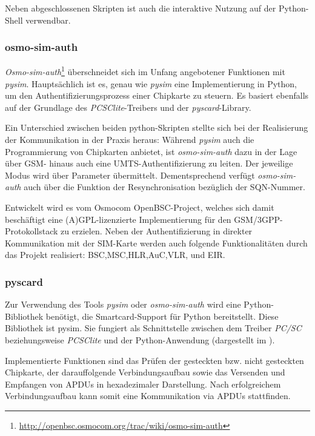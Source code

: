 Neben abgeschlossenen Skripten ist auch die interaktive Nutzung auf der
Python-Shell verwendbar.

\subsubsection{osmo-sim-auth}
\label{subsec:osmosim}
\textit{Osmo-sim-auth}\footnote{\url{http://openbsc.osmocom.org/trac/wiki/osmo-sim-auth}}
überschneidet sich im Unfang angebotener Funktionen mit \textit{pysim}. Hauptsächlich ist es,
genau wie \textit{pysim} eine Implementierung in Python, um den Authentifizierungsprozess
einer Chipkarte zu steuern. Es basiert ebenfalls auf der Grundlage des
\textit{PCSClite}-Treibers und der \textit{pyscard}-Library.

Ein Unterschied zwischen beiden python-Skripten stellte sich bei der
Realisierung der Kommunikation in der Praxis heraus:
Während \textit{pysim} auch die Programmierung von Chipkarten anbietet, ist
\textit{osmo-sim-auth} dazu in der Lage über \ac{GSM}- hinaus auch
eine \ac{UMTS}-Authentifizierung zu leiten.
Der jeweilige Modus wird über Parameter übermittelt.
Dementsprechend verfügt \textit{osmo-sim-auth} auch über die Funktion der
Resynchronisation bezüglich der \ac{SQN}-Nummer\cite{osmosimweb}.

Entwickelt wird es vom Osmocom OpenBSC-Project, welches sich damit
beschäftigt eine (A)GPL-lizenzierte Implementierung für den
GSM/3GPP-Protokollstack zu erzielen. Neben der Authentifizierung
in direkter Kommunikation mit der SIM-Karte werden auch folgende
Funktionalitäten durch das Projekt realisiert:
\ac{BSC},\ac{MSC},\ac{HLR},\ac{AuC},\ac{VLR}, und \ac{EIR}\cite{osmocombscweb}.

\subsubsection{pyscard}
\label{pyscard}
Zur Verwendung des Tools \textit{pysim} oder \textit{osmo-sim-auth} wird eine Python-Bibliothek benötigt,
die Smartcard-Support für Python bereitstellt. Diese Bibliothek
ist pysim. Sie fungiert als Schnittstelle zwischen dem Treiber \textit{PC/SC}
beziehungsweise \textit{PCSClite} und der Python-Anwendung 
(dargestellt im ).

Implementierte Funktionen sind das Prüfen der gesteckten bzw. nicht gesteckten
Chipkarte, der darauffolgende Verbindungsaufbau sowie das Versenden und
Empfangen von APDUs in hexadezimaler Darstellung.
Nach erfolgreichem Verbindungsaufbau kann somit eine Kommunikation via
APDUs stattfinden.

